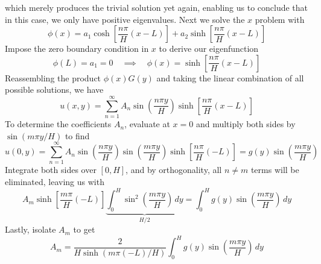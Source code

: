 \documentclass[a4paper]{article}
\begin{document}
which merely produces the trivial solution yet again, enabling us to conclude that in this case, we only have positive eigenvalues. Next we solve the \( x \) problem with
\[
	\phi \!\left( x \right) = a_{1}\cosh\!\left[\frac{n \pi}{H}\!\left( x - L \right)\right] + a_{2}\sinh\!\left[\frac{n \pi}{H}\!\left( x - L \right)\right]
\]
Impose the zero boundary condition in \( x \) to derive our eigenfunction
\[
	\phi \!\left( L \right) = a_{1} = 0 \quad \implies \quad \phi \!\left( x \right) = \sinh\!\left[ \frac{n \pi}{H}\!\left( x - L \right) \right]
\]
Reassembling the product \( \phi \!\left( x \right)G \!\left( y \right) \) and taking the linear combination of all possible solutions, we have
\[
	u \!\left( x,y \right) = \sum^{\infty}_{n=1} A_{n}\sin\!\left(\frac{n \pi y}{H}\right)\sinh\!\left[\frac{n \pi}{H}\!\left( x - L \right)\right]
\]
To determine the coefficients \( A_{n} \), evaluate at \( x = 0 \) and multiply both sides by \( \sin\!\left(m \pi y / H\right) \) to find
\[
	u \!\left( 0,y \right) = \sum^{\infty}_{n=1} A_{n}\sin\!\left(\frac{n \pi y}{H}\right)\sin\!\left(\frac{m \pi y}{H}\right)\sinh\!\left[\frac{n \pi}{H}\!\left( - L \right)\right] = g \!\left( y \right)\sin\!\left(\frac{m \pi y}{H}\right)
\]
Integrate both sides over \( \!\left[ 0,H \right] \), and by orthogonality, all \( n \neq m \) terms will be eliminated, leaving us with
\[
	A_{m}\sinh\!\left[\frac{m \pi}{H}\!\left( -L \right)\right]\underbrace{\int^{H}_{0} \sin^{2}\!\left(\frac{m \pi y}{H}\right) \, dy}_{H / 2} = \int^{H}_{0} g \!\left( y \right)\sin\!\left(\frac{m \pi y}{H}\right) \, dy  
\]
Lastly, isolate \( A_{m} \) to get
\[
	A_{m} = \frac{2}{H \sinh\!\left(m \pi \!\left( -L \right) / H\right)} \int^{H}_{0} g \!\left( y \right)\sin\!\left(\frac{m \pi y}{H}\right) \, dy  
\]
\end{document}
